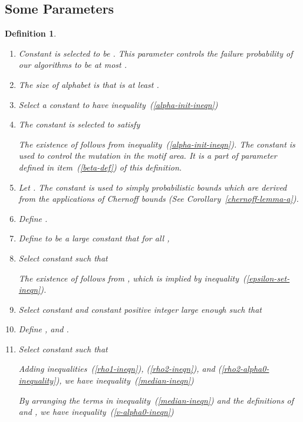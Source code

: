 \documentclass[11pt]{article}
\newtheorem{dfntn}[theoremfoo]{Definition}
\newenvironment{definition}{\pagebreak[1]\begin{dfntn}\rm}{\end{dfntn}}
\newcommand{\scrod}{\quad\nopagebreak}
\begin{document}
\subsection{Some Parameters}
\begin{definition}\label{param-def}\scrod
\begin{enumerate}
\item
Constant  is selected to be . This parameter controls the
failure probability of our algorithms to be at most .
\item
The size of alphabet is  that is at least .
\item
Select a constant  to have
inequality~(\ref{alpha-init-ineqn})

\item The constant  is selected to satisfy

The existence of  follows from
inequality~(\ref{alpha-init-ineqn}). The constant  is used
to control the mutation in the motif area. It is a part of parameter
 defined in item~(\ref{beta-def}) of this definition.

\item
Let . The constant  is used to simply
probabilistic bounds which are derived from the applications of
Chernoff bounds (See Corollary~\ref{chernoff-lemma-a}).

\item
Define .

\item
 Define  to be a large constant that for all ,




\item Select constant  such that


The existence of  follows from , which is implied by
inequality~(\ref{epsilon-set-ineqn}).



\item Select constant  and  constant positive integer  large enough such that


\item
Define , and
.




\item Select constant  such that

 Adding inequalities~(\ref{rho1-ineqn}), (\ref{rho2-ineqn}), and (\ref{rho2-alpha0-inequality}), we have
 inequality~(\ref{median-ineqn})



By arranging the terms in inequality~(\ref{median-ineqn}) and the
definitions of  and , we have
inequality~(\ref{v-alpha0-ineqn})






\end{enumerate}
\end{definition}
\end{document}
